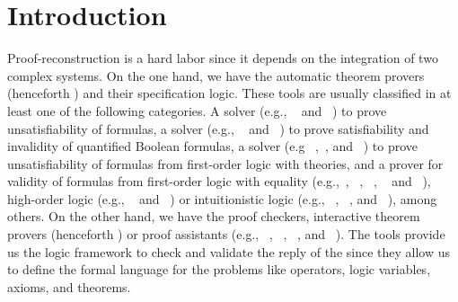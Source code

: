 \documentclass[../main.tex]{subfiles}
\begin{document}

\section{Introduction}
\label{sec:introduction}

Proof-reconstruction is a hard labor since it depends on the
integration of two complex systems. On the one hand, we have the
automatic theorem provers (henceforth \ATP) and their specification
logic. These tools are usually classified in at least one of the
following categories.
A \SAT solver (e.g., ~\cite{Moskewicz2001} and
~\cite{Een2004}) to prove unsatisfiability of \CNF
formulas, a  solver (e.g.,
~\cite{Klieber2014} and
~\cite{Lonsing2017}) to prove satisfiability and
invalidity of quantified Boolean formulas, a \SMT solver
(e.g ~\cite{Barrett2011},~\cite{bouton2009},
and ~\cite{DeMoura2008}) to prove unsatisfiability of
formulas from first-order logic with theories, and a prover for
validity of formulas from first-order logic with equality
(e.g.,~\cite{Schulz:AICOM-2002},
~\cite{Otten2008},
\Metis~\cite{hurd2003first},
~\cite{Weidenbach2009} and
~\cite{Riazanov1999}), high-order logic (e.g.,
~\cite{Benzmuller2008} and
~\cite{Brown2012}) or intuitionistic logic (e.g.,
~\cite{Otten2008},
~\cite{Schmitt2001}, and
~\cite{Tammet1997}), among others. On the other hand,
we have the proof checkers, interactive theorem provers (henceforth
\ITP) or proof assistants (e.g., \Agda~\cite{agdateam},
~\cite{coqteam},
~\cite{paulson1994isabelle}, and
~\cite{norrish2007hol}). The \ITP tools provide us the
logic framework to check and validate the reply of the \ATPs since
they allow us to define the formal language for the problems like
operators, logic variables, axioms, and theorems.
\end{document}
